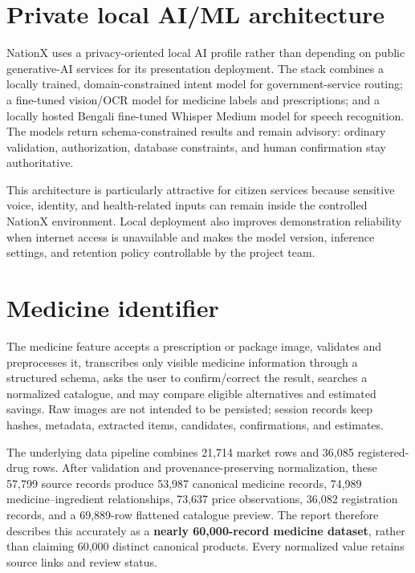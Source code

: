 \documentclass[12pt,a4paper,oneside]{report}
\begin{document}
\section{Private local AI/ML architecture}

NationX uses a privacy-oriented local AI profile rather than depending on public generative-AI
services for its presentation deployment. The stack combines a locally trained, domain-constrained
intent model for government-service routing; a fine-tuned vision/OCR model for medicine labels and
prescriptions; and a locally hosted Bengali fine-tuned Whisper Medium model for speech recognition.
The models return schema-constrained results and remain advisory: ordinary validation,
authorization, database constraints, and human confirmation stay authoritative.

This architecture is particularly attractive for citizen services because sensitive voice,
identity, and health-related inputs can remain inside the controlled NationX environment. Local
deployment also improves demonstration reliability when internet access is unavailable and makes
the model version, inference settings, and retention policy controllable by the project team.

\section{Medicine identifier}

The medicine feature accepts a prescription or package image, validates and preprocesses it,
transcribes only visible medicine information through a structured schema, asks the user to
confirm/correct the result, searches a normalized catalogue, and may compare eligible alternatives
and estimated savings. Raw images are not intended to be persisted; session records keep hashes,
metadata, extracted items, candidates, confirmations, and estimates.

The underlying data pipeline combines 21,714 market rows and 36,085 registered-drug rows. After
validation and provenance-preserving normalization, these 57,799 source records produce 53,987
canonical medicine records, 74,989 medicine--ingredient relationships, 73,637 price observations,
36,082 registration records, and a 69,889-row flattened catalogue preview. The report therefore
describes this accurately as a \textbf{nearly 60,000-record medicine dataset}, rather than claiming
60,000 distinct canonical products. Every normalized value retains source links and review status.
\end{document}
